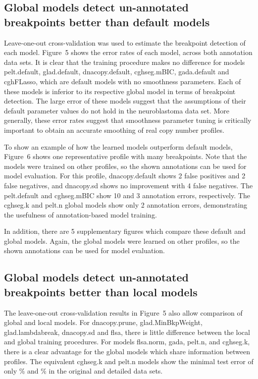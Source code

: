 \documentclass[10pt]{bmc_article}
\newenvironment{bmcformat}{\begin{raggedright}\baselineskip20pt\sloppy\setboolean{publ}{false}}{\end{raggedright}\baselineskip20pt\sloppy}
\begin{document}
\begin{bmcformat}
\subsection*{Global models detect un-annotated breakpoints 
better than
  default models}

Leave-one-out cross-validation was used to estimate the breakpoint
detection of each model. Figure~5 shows the error rates of each model,
across both annotation data sets.  It is clear that the training
procedure makes no difference for models pelt.default, glad.default,
dnacopy.default, cghseg.mBIC, gada.default and cghFLasso, which are
default models with no smoothness parameters. Each of these models is
inferior to its respective global model in terms of breakpoint
detection. The large error of these models suggest that the
assumptions of their default parameter values do not hold in the
neuroblastoma data set. More generally, these error rates suggest that
smoothness parameter tuning is critically important to obtain an
accurate smoothing of real copy number profiles.

To show an example of how the learned models outperform default
models, Figure~6 shows one representative profile with many
breakpoints. Note that the models were trained on other profiles, so
the shown annotations can be used for model evaluation. For this
profile, dnacopy.default shows 2 false positives and 2 false
negatives, and dnacopy.sd shows no improvement with 4 false
negatives. The pelt.default and cghseg.mBIC show 10 and 3 annotation
errors, respectively. The cghseg.k and pelt.n global models show only
2 annotation errors, demonstrating the usefulness of annotation-based
model training.

In addition, there are 5 supplementary figures which compare these
default and global models. Again, the global models were learned on
other profiles, so the shown annotations can be used for model
evaluation.

\subsection*{Global models detect un-annotated
 breakpoints better than local
  models}

The leave-one-out cross-validation results in Figure~5 also allow
comparison of global and local models. For dnacopy.prune,
glad.MinBkpWeight, glad.lambdabreak, dnacopy.sd and flsa, there is
little difference between the local and global training
procedures. For models flsa.norm, gada, pelt.n, and cghseg.k, there
is a clear advantage for the global models which share
information between profiles. The equivalent cghseg.k and pelt.n
models show the minimal test error of only
\unskip\% and
\unskip\% in the original and detailed
data sets.


\end{bmcformat}
\end{document}
